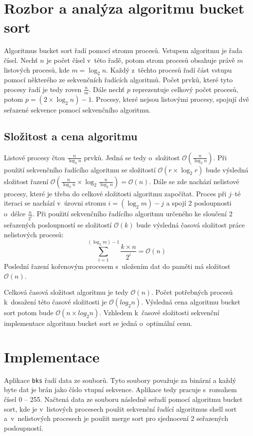 \documentclass[11pt,a4paper,titlepage]{article}
\begin{document}
    \section{Rozbor a analýza algoritmu bucket sort}
        Algoritmus bucket sort řadí pomocí stromu procesů. Vstupem algoritmu je řada čísel.
        Nechť $n$ je počet čísel v~této řadě, potom strom procesů obsahuje právě $m$ listových
        procesů, kde $m = \log_2 n$. Každý z~těchto procesů řadí část vstupu pomocí některého
        ze sekvenčních řadících algoritmů. Počet prvků, které tyto procesy řadí je tedy roven $\frac{n}{m}$.
        Dále nechť $p$ reprezentuje celkový počet procesů, potom $p = (2 \times \log_2 n) - 1$.
        Procesy, které nejsou listovými procesy, spojují dvě seřazené sekvence pomocí
        sekvenčního algoritmu.

        \subsection{Složitost a cena algoritmu}
        Listové procesy čtou $\frac{n}{\log_2 n}$ prvků. Jedná se tedy o~složitost $\mathcal{O}(\frac{n}{\log_2 n})$.
        Při použití sekvenčního řadícího algoritmu se složitostí $\mathcal{O}(r \times \log_2 r)$ bude výsledná složitost
        řazení $\mathcal{O}(\frac{n}{\log_2 n} \times \log_2 \frac{n}{\log_2 n}) = \mathcal{O}(n)$. Dále se zde nachází
        nelistové procesy, které je třeba do celkové složitosti algoritmu započítat. Proces při $j$--té iteraci se nachází
        v~úrovni stromu $i = (\log_2 m) - j$ a spojí 2 posloupnosti o~délce $\frac{n}{2^i}$. Při použití sekvenčního řadícího
        algoritmu určeného ke sloučení 2 seřazených posloupností se složitostí $\mathcal{O}(k)$ bude výsledná časová složitost
        práce nelistových procesů:
        $$\sum_{i=1}^{(\log_2 m) - 1} \frac{k \times n}{2^i} = \mathcal{O}(n)$$
        Poslední řazení kořenovým procesem s~uložením dat do paměti má složitost $\mathcal{O}(n)$.

        Celková časová složitost algoritmu je tedy $\mathcal{O}(n)$. Počet potřebných procesů k~dosažení této
        časové složitosti je $\mathcal{O}(log_2 n)$. Výsledná cena algoritmu bucket sort potom bude $\mathcal{O}(n \times log_2 n)$.
        Vzhledem k~časové složitosti sekvenční implementace algoritmu bucket sort se jedná o~optimální cenu.

	\section{Implementace}
        Aplikace \texttt{bks} řadí data ze souborů. Tyto soubory považuje za binární a každý byte dat je brán jako číslo vtupní sekvence.
        Aplikace tedy pracuje s~rozsahem čísel 0 -- 255. Načtená data ze souboru následně seřadí pomocí algoritmu bucket sort,
        kde je v~listových procesech použit sekvenční řadící algoritmus shell sort a~v~nelistových procesech je použit
        merge sort pro sjednocení 2 seřazených posloupností.
\end{document}
